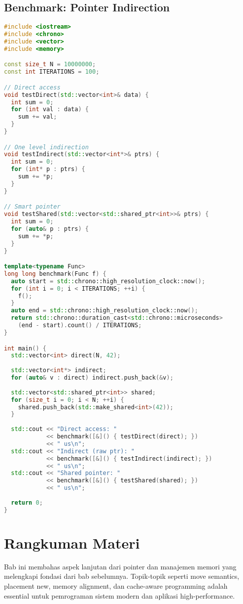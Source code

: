 \documentclass[../main.tex]{subfiles}
\begin{document}
\subsection{Benchmark: Pointer Indirection}
\begin{lstlisting}[language=C++, caption={Impact of pointer indirection}]
#include <iostream>
#include <chrono>
#include <vector>
#include <memory>

const size_t N = 10000000;
const int ITERATIONS = 100;

// Direct access
void testDirect(std::vector<int>& data) {
  int sum = 0;
  for (int val : data) {
    sum += val;
  }
}

// One level indirection
void testIndirect(std::vector<int*>& ptrs) {
  int sum = 0;
  for (int* p : ptrs) {
    sum += *p;
  }
}

// Smart pointer
void testShared(std::vector<std::shared_ptr<int>>& ptrs) {
  int sum = 0;
  for (auto& p : ptrs) {
    sum += *p;
  }
}

template<typename Func>
long long benchmark(Func f) {
  auto start = std::chrono::high_resolution_clock::now();
  for (int i = 0; i < ITERATIONS; ++i) {
    f();
  }
  auto end = std::chrono::high_resolution_clock::now();
  return std::chrono::duration_cast<std::chrono::microseconds>
    (end - start).count() / ITERATIONS;
}

int main() {
  std::vector<int> direct(N, 42);
  
  std::vector<int*> indirect;
  for (auto& v : direct) indirect.push_back(&v);
  
  std::vector<std::shared_ptr<int>> shared;
  for (size_t i = 0; i < N; ++i) {
    shared.push_back(std::make_shared<int>(42));
  }
  
  std::cout << "Direct access: " 
            << benchmark([&]() { testDirect(direct); }) 
            << " us\n";
  std::cout << "Indirect (raw ptr): " 
            << benchmark([&]() { testIndirect(indirect); }) 
            << " us\n";
  std::cout << "Shared pointer: " 
            << benchmark([&]() { testShared(shared); }) 
            << " us\n";
  
  return 0;
}
\end{lstlisting}

\section{Rangkuman Materi}
Bab ini membahas aspek lanjutan dari pointer dan manajemen memori yang melengkapi fondasi dari bab sebelumnya. Topik-topik seperti move semantics, placement new, memory alignment, dan cache-aware programming adalah essential untuk pemrograman sistem modern dan aplikasi high-performance.
\end{document}
